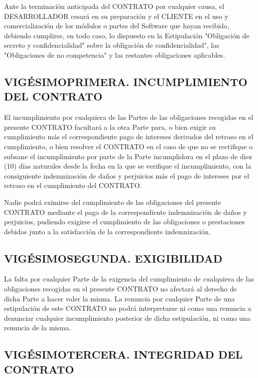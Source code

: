 \documentclass[a4paper,11pt]{report}
\begin{document}
	Ante la terminación anticipada del CONTRATO por cualquier causa, el
	DESARROLLADOR cesará en su preparación y el CLIENTE en el uso y
	comercialización de los módulos o partes del Software que hayan
	recibido, debiendo cumplirse, en todo caso, lo dispuesto en la
	Estipulación "Obligación de secreto y confidencialidad" sobre la
	obligación de confidencialidad", las "Obligaciones de no competencia" y
	las restantes obligaciones aplicables.

	\subsection*{VIGÉSIMOPRIMERA. INCUMPLIMIENTO DEL CONTRATO}

	El incumplimiento por cualquiera de las Partes de las obligaciones
	recogidas en el presente CONTRATO facultará a la otra Parte para, o bien
	exigir su cumplimiento más el correspondiente pago de intereses
	derivados del retraso en el cumplimiento, o bien resolver el CONTRATO en
	el caso de que no se rectifique o subsane el incumplimiento por parte de
	la Parte incumplidora en el plazo de diez (10) días naturales desde la
	fecha en la que se verifique el incumplimiento, con la consiguiente
	indemnización de daños y perjuicios más el pago de intereses por el
	retraso en el cumplimiento del CONTRATO.

	Nadie podrá eximirse del cumplimiento de las obligaciones del presente
	CONTRATO mediante el pago de la correspondiente indemnización de daños y
	perjuicios, pudiendo exigirse el cumplimiento de las obligaciones o
	prestaciones debidas junto a la satisfacción de la correspondiente
	indemnización.

	\subsection*{VIGÉSIMOSEGUNDA. EXIGIBILIDAD}

	La falta por cualquier Parte de la exigencia del cumplimiento de
	cualquiera de las obligaciones recogidas en el presente CONTRATO no
	afectará al derecho de dicha Parte a hacer valer la misma. La renuncia
	por cualquier Parte de una estipulación de este CONTRATO no podrá
	interpretarse ni como una renuncia a denunciar cualquier incumplimiento
	posterior de dicha estipulación, ni como una renuncia de la misma.

	\subsection*{VIGÉSIMOTERCERA. INTEGRIDAD DEL CONTRATO}
\end{document}

